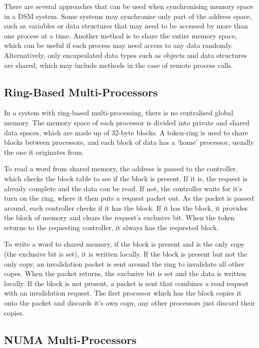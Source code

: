 There are several approaches that can be used when synchronising memory space in a DSM system. Some systems may synchronise only part of the address space, such as variables or data structures that may need to be accessed by more than one process at a time. Another method is to share the entire memory space, which can be useful if each process may need access to any data randomly. Alternatively, only encapsulated data types such as objects and data structures are shared, which may include methods in the case of remote process calls.

\subsection*{Ring-Based Multi-Processors}

In a system with ring-based multi-processing, there is no centralised global memory. The memory space of each processor is divided into private and shared data spaces, which are made up of 32-byte blocks. A token-ring is used to share blocks between processors, and each block of data has a `home' processor, usually the one it originates from.

To read a word from shared memory, the address is passed to the controller, which checks the block table to see if the block is present. If it is, the request is already complete and the data can be read. If not, the controller waits for it's turn on the ring, where it then puts a request packet out. As the packet is passed around, each controller checks if it has the block. If it has the block, it provides the block of memory and clears the request's exclusive bit. When the token returns to the requesting controller, it always has the requested block.

To write a word to shared memory, if the block is present and is the only copy (the exclusive bit is set), it is written locally. If the block is present but not the only copy, an invalidation packet is sent around the ring to invalidate all other copes. When the packet returns, the exclusive bit is set and the data is written locally. If the block is not present, a packet is sent that combines a read request with an invalidation request. The first processor which has the block copies it onto the packet and discards it's own copy, any other processors just discard their copies.

\subsection*{NUMA Multi-Processors}

